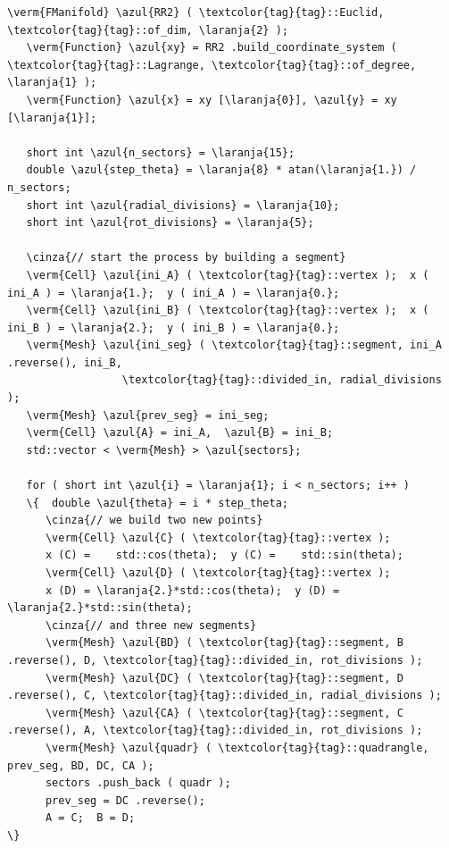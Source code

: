 \begin{Verbatim}[commandchars=\\\{\},formatcom=\small\tt,frame=single,
   label=parag-\ref{\numb section 9.\numb parag 2}.cpp,rulecolor=\color{moldura},
   baselinestretch=0.94,framesep=2mm                                            ]
   \verm{FManifold} \azul{RR2} ( \textcolor{tag}{tag}::Euclid, \textcolor{tag}{tag}::of_dim, \laranja{2} );
   \verm{Function} \azul{xy} = RR2 .build_coordinate_system ( \textcolor{tag}{tag}::Lagrange, \textcolor{tag}{tag}::of_degree, \laranja{1} );
   \verm{Function} \azul{x} = xy [\laranja{0}], \azul{y} = xy [\laranja{1}];

   short int \azul{n_sectors} = \laranja{15};
   double \azul{step_theta} = \laranja{8} * atan(\laranja{1.}) / n_sectors;
   short int \azul{radial_divisions} = \laranja{10};
   short int \azul{rot_divisions} = \laranja{5};

   \cinza{// start the process by building a segment}
   \verm{Cell} \azul{ini_A} ( \textcolor{tag}{tag}::vertex );  x ( ini_A ) = \laranja{1.};  y ( ini_A ) = \laranja{0.};
   \verm{Cell} \azul{ini_B} ( \textcolor{tag}{tag}::vertex );  x ( ini_B ) = \laranja{2.};  y ( ini_B ) = \laranja{0.};
   \verm{Mesh} \azul{ini_seg} ( \textcolor{tag}{tag}::segment, ini_A .reverse(), ini_B,
                  \textcolor{tag}{tag}::divided_in, radial_divisions     );
   \verm{Mesh} \azul{prev_seg} = ini_seg;
   \verm{Cell} \azul{A} = ini_A,  \azul{B} = ini_B;
   std::vector < \verm{Mesh} > \azul{sectors};

   for ( short int \azul{i} = \laranja{1}; i < n_sectors; i++ )
   \{  double \azul{theta} = i * step_theta;
      \cinza{// we build two new points}
      \verm{Cell} \azul{C} ( \textcolor{tag}{tag}::vertex );
      x (C) =    std::cos(theta);  y (C) =    std::sin(theta);
      \verm{Cell} \azul{D} ( \textcolor{tag}{tag}::vertex );
      x (D) = \laranja{2.}*std::cos(theta);  y (D) = \laranja{2.}*std::sin(theta);
      \cinza{// and three new segments}
      \verm{Mesh} \azul{BD} ( \textcolor{tag}{tag}::segment, B .reverse(), D, \textcolor{tag}{tag}::divided_in, rot_divisions );
      \verm{Mesh} \azul{DC} ( \textcolor{tag}{tag}::segment, D .reverse(), C, \textcolor{tag}{tag}::divided_in, radial_divisions );
      \verm{Mesh} \azul{CA} ( \textcolor{tag}{tag}::segment, C .reverse(), A, \textcolor{tag}{tag}::divided_in, rot_divisions );
      \verm{Mesh} \azul{quadr} ( \textcolor{tag}{tag}::quadrangle, prev_seg, BD, DC, CA );
      sectors .push_back ( quadr );
      prev_seg = DC .reverse();
      A = C;  B = D;                                                             \}


\end{Verbatim}
